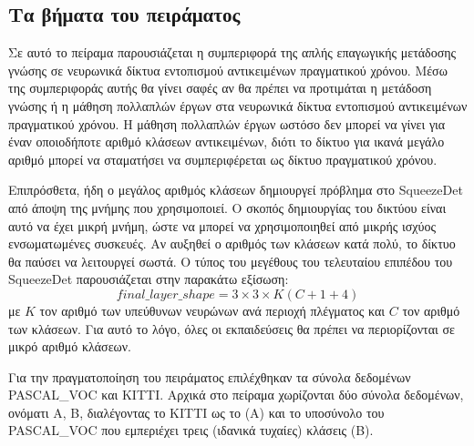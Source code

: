 \subsection{Τα βήματα του πειράματος}
Σε αυτό το πείραμα παρουσιάζεται η συμπεριφορά της απλής επαγωγικής μετάδοσης γνώσης σε νευρωνικά δίκτυα εντοπισμού αντικειμένων πραγματικού χρόνου. Μέσω της συμπεριφοράς αυτής θα γίνει σαφές αν θα πρέπει να προτιμάται η μετάδοση γνώσης ή η μάθηση πολλαπλών έργων στα νευρωνικά δίκτυα εντοπισμού αντικειμένων πραγματικού χρόνου. Η μάθηση πολλαπλών έργων ωστόσο δεν μπορεί να γίνει για έναν οποιοδήποτε αριθμό κλάσεων αντικειμένων, διότι το δίκτυο για ικανά μεγάλο αριθμό μπορεί να σταματήσει να συμπεριφέρεται ως δίκτυο πραγματικού χρόνου.

Επιπρόσθετα, ήδη ο μεγάλος αριθμός κλάσεων δημιουργεί πρόβλημα στο SqueezeDet από άποψη της μνήμης που χρησιμοποιεί. Ο σκοπός δημιουργίας του δικτύου είναι αυτό να έχει μικρή μνήμη, ώστε να μπορεί να χρησιμοποιηθεί από μικρής ισχύος ενσωματωμένες συσκευές. Αν αυξηθεί ο αριθμός των κλάσεων κατά πολύ, το δίκτυο θα παύσει να λειτουργεί σωστά. Ο τύπος του μεγέθους του τελευταίου επιπέδου του SqueezeDet παρουσιάζεται στην παρακάτω εξίσωση:
$$
final\_layer\_shape = 3 \times 3 \times K(C+ 1 + 4)
$$
με $K$ τον αριθμό των υπεύθυνων νευρώνων ανά περιοχή πλέγματος και $C$ τον αριθμό των κλάσεων. Για αυτό το λόγο, όλες οι εκπαιδεύσεις θα πρέπει να περιορίζονται σε μικρό αριθμό κλάσεων.

Για την πραγματοποίηση του πειράματος επιλέχθηκαν τα σύνολα δεδομένων PASCAL\_VOC και KITTI. Αρχικά στο πείραμα χωρίζονται δύο σύνολα δεδομένων, ονόματι A, B, διαλέγοντας το KITTI ως το (Α) και το υποσύνολο του PASCAL\_VOC που εμπεριέχει τρεις (ιδανικά τυχαίες) κλάσεις (Β).

